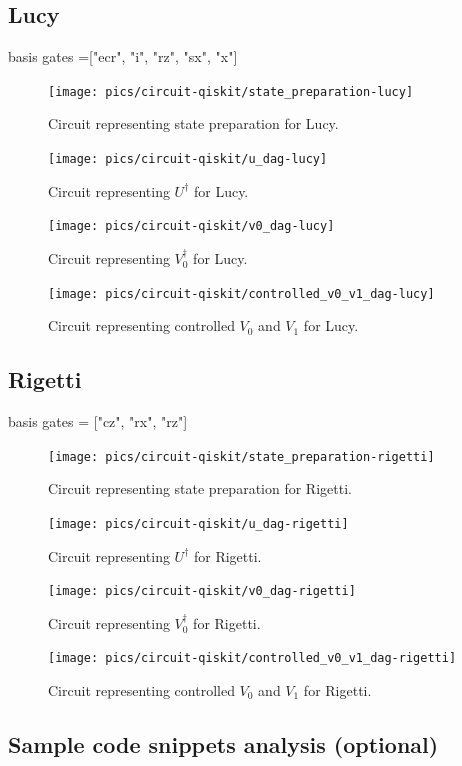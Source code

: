 \documentclass[preprint,12pt, a4paper]{elsarticle}
\newcommand{\1}{{\rm 1\hspace{-0.9mm}l}}
\begin{document}
\subsection{Lucy}
 basis gates  =["ecr", "i", "rz", "sx", "x"] 
\begin{figure}[h!]
\centering
\texttt{[image: pics/circuit-qiskit/state\_preparation-lucy]}
\caption{Circuit representing state preparation for Lucy.}
\end{figure}
\begin{figure}[h!]
\centering
\texttt{[image: pics/circuit-qiskit/u\_dag-lucy]}
\caption{Circuit representing $U^\dagger$ for Lucy.}
\end{figure}
\begin{figure}[h!]
\centering
\texttt{[image: pics/circuit-qiskit/v0\_dag-lucy]}
\caption{Circuit representing $V_0^\dagger$ for Lucy.}
\end{figure}
\begin{figure}[h!]
\centering
\texttt{[image: pics/circuit-qiskit/controlled\_v0\_v1\_dag-lucy]}
\caption{Circuit representing controlled $V_0$ and $V_1$ for Lucy.}
\end{figure}


\subsection{Rigetti}
 basis gates = ["cz", "rx", "rz"]
\begin{figure}[h!]
\centering
\texttt{[image: pics/circuit-qiskit/state\_preparation-rigetti]}
\caption{Circuit representing state preparation for Rigetti.}
\end{figure}
\begin{figure}[h!]
\centering
\texttt{[image: pics/circuit-qiskit/u\_dag-rigetti]}
\caption{Circuit representing $U^\dagger$ for Rigetti.}
\end{figure}
\begin{figure}[h!]
\centering
\texttt{[image: pics/circuit-qiskit/v0\_dag-rigetti]}
\caption{Circuit representing $V_0^\dagger$ for Rigetti.}
\end{figure}
\begin{figure}[h!]
\centering
\texttt{[image: pics/circuit-qiskit/controlled\_v0\_v1\_dag-rigetti]}
\caption{Circuit representing controlled $V_0$ and $V_1$ for Rigetti.}
\end{figure}


\subsection{Sample code snippets analysis (optional)}
\label{}
\end{document}
